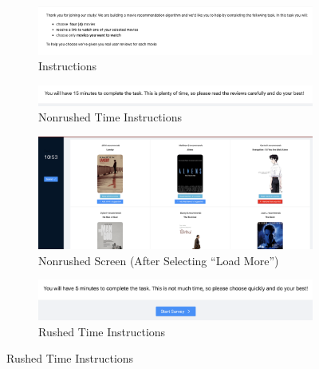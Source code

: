 \documentclass[12pt,letterpaper]{article}
\begin{document}
\begin{figure}[ht]
\caption{Lab Experiment Screenshots}
\label{fig:lab_images}
    \begin{subfigure}{1\textwidth} 
        \centering
        \includegraphics[width=1\linewidth]{Misc Screenshots/LabExpInstructions.png}   
        \caption{Instructions}
        \label{fig:lab_instructions}
        \end{subfigure}
    \begin{subfigure}{.5\textwidth}
       \centering
        \includegraphics[width=1\linewidth]{Misc Screenshots/NonRushedTimeInstructions.png}  
        \caption{Nonrushed Time Instructions}
         \label{fig:lab_nonrush_instructions}
    \end{subfigure}
     \begin{subfigure}{.5\textwidth}
       \centering
        \includegraphics[width=1\linewidth]{Misc Screenshots/NonRushedScreenShotwithLoadMore.png}  
        \caption{Nonrushed Screen (After Selecting ``Load More'')}
         \label{fig:lab_nonrush_screenshot}
    \end{subfigure}
     \begin{subfigure}{.5\textwidth}
       \centering
        \includegraphics[width=1\linewidth]{Misc Screenshots/RushedTimeInstructions.png}  
        \caption{Rushed Time Instructions}

\end{subfigure}
\end{figure}
\end{document}
